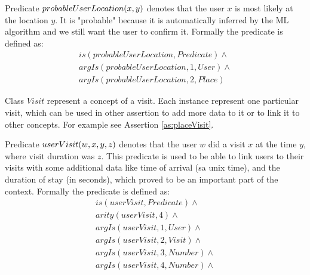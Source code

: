 \begin{definition}
\label{pred:probableUserLocation}

Predicate $\\probableUserLocation(x,y)$ denotes that the user $x$ is most likely
at the location $y$. It is "probable" because it is automatically inferred by 
the ML algorithm and we still want the user to confirm it.
Formally the predicate is defined as:
\begin{equation}\label{as:probableUserLoc}
\begin{gathered}
    is(probableUserLocation,Predicate) \land \\
	argIs(probableUserLocation,1,User) \land\\
	argIs(probableUserLocation,2, Place)
\end{gathered}
\end{equation}
\end{definition}

\begin{definition}\label{def:visit}
Class $Visit$ represent a concept of a visit. Each instance represent one
particular visit, which can be used in other assertion to add more data to it
or to link it to other concepts. For example see Assertion 
\ref{as:placeVisit}.
\end{definition}

\begin{definition}
\label{pred:userVisit}
Predicate $\\userVisit(w,x,y,z)$ denotes that the user $w$ did a visit $x$
at the time $y$, where visit duration was $z$. This predicate is used to be 
able to link users to their visits with some additional data like time of
arrival (sa unix time), and the duration of stay (in seconds), which proved to 
be an important part of the context. Formally the predicate is defined as:
\begin{equation}\label{as:userVisit}
\begin{gathered}
    is(userVisit,Predicate) \land \\
	arity(userVisit,4) \land \\
	argIs(userVisit,1,User) \land\\
	argIs(userVisit,2, Visit) \land \\
	argIs(userVisit,3,Number) \land \\
	argIs(userVisit,4,Number) \land
\end{gathered}
\end{equation}
\end{definition}

